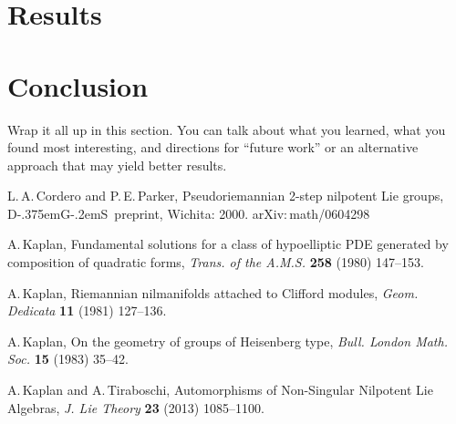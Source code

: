 \documentclass[11 pt]{article}
\newcommand{\DGS}{D{\kern-.375em}G{\kern-.2em}S}
\begin{document}
\section{Results}

\section{Conclusion}

Wrap it all up in this section. You can talk about what you learned, what
you found most interesting, and directions for ``future work'' or an
alternative approach that may yield better results.

\begin{thebibliography}{99}
L.\,A.\,Cordero and P.\,E.\,Parker, Pseudoriemannian 2-step
nilpotent Lie groups, \DGS\ preprint, Wichita: 2000.
{\sf arXiv:\,math/0604298}

A.\,Kaplan, Fundamental solutions for a class of hypoelliptic PDE
generated by composition of quadratic forms, {\it Trans. of the A.M.S.}
{\bf 258}
(1980) 147--153.

A.\,Kaplan, Riemannian nilmanifolds attached to Clifford modules,
{\it Geom. Dedicata} {\bf 11} (1981) 127--136.

A.\,Kaplan, On the geometry of groups of Heisenberg type, {\it Bull.
London Math. Soc.} {\bf 15} (1983) 35--42.

A.\,Kaplan and A.\,Tiraboschi, Automorphisms of Non-Singular
Nilpotent Lie Algebras, {\it J. Lie Theory} {\bf 23} (2013) 1085--1100.
\end{thebibliography}
\end{document}
